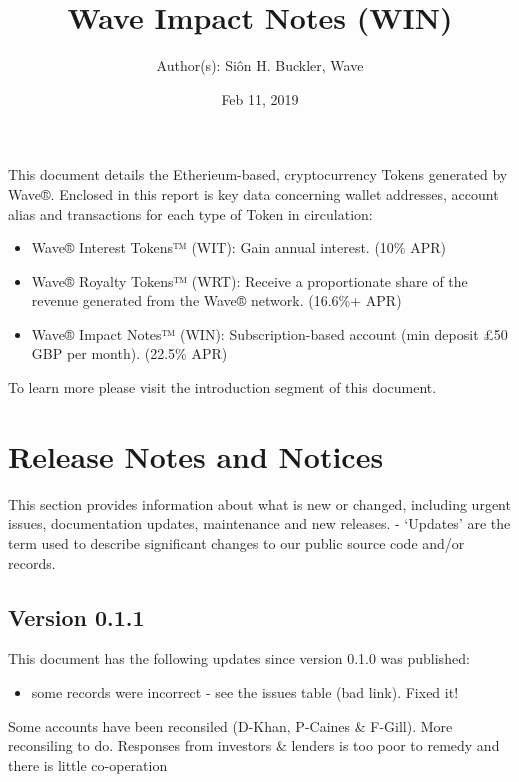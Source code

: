 \documentclass[letterpaper,10pt,openany,oneside,english]{sphinxmanual}
\title{Wave Impact Notes (WIN)}
\date{Feb 11, 2019}
\author{Author(s): Siôn H. Buckler, Wave}
\begin{document}
\maketitle
\sphinxtableofcontents
{}\label{\detokenize{index::doc}}


This document details the Etherieum-based, cryptocurrency Tokens generated by Wave®.
Enclosed in this report is key data concerning wallet addresses, account alias and transactions for each type of Token in circulation:
\begin{itemize}
\item {} 
Wave® Interest Tokens™ (WIT): Gain annual interest. (10\% APR)

\item {} 
Wave® Royalty Tokens™ (WRT): Receive a proportionate share of the revenue generated from the Wave® network. (16.6\%+ APR)

\item {} 
Wave® Impact Notes™ (WIN): Subscription-based account (min deposit £50 GBP per month). (22.5\% APR)

\end{itemize}

To learn more please visit the introduction segment of this document.


\chapter{Release Notes and Notices}
\label{\detokenize{releasenotes:release-notes-and-notices}}\label{\detokenize{releasenotes::doc}}
This section provides information about what is new or changed, including urgent issues, documentation updates, maintenance and new releases.
- ‘Updates’ are the term used to describe significant changes to our public source code and/or records.


\section{Version 0.1.1}
\label{\detokenize{releasenotes:version-0-1-1}}
This document has the following updates since version 0.1.0 was published:
\begin{itemize}
\item {} 
some records were incorrect - see the issues table (bad link). Fixed it!

\end{itemize}

Some accounts have been reconsiled (D-Khan, P-Caines \& F-Gill).
More reconsiling to do. Responses from investors \& lenders is too poor to remedy and there is little co-operation
\end{document}
